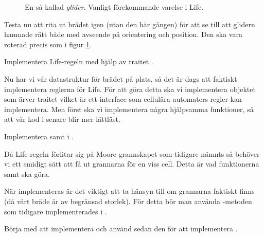 \begin{figure}[h]
  \begin{center}
  \end{center}
  \caption{En så kallad \textit{glider}. Vanligt förekommande varelse i Life.}
  \label{fig:threads:life:glider}
\end{figure}

Testa nu att rita ut brädet igen (utan  den här gången) för att se till att glidern hamnade rätt både med avseende på orientering och position. Den ska vara roterad precis som i figur \ref{fig:threads:life:glider}.


\Task Implementera Life-regeln med hjälp av traitet .

Nu har vi vår datastruktur för brädet på plats, så det är dags att faktiskt implementera reglerna för Life. För att göra detta ska vi implementera objektet  som ärver traitet  vilket är ett interface som cellulära automaters regler kan implementera. Men först ska vi implementera några hjälpsamma funktioner, så att vår kod i  senare blir mer lättläst.

\Subtask Implementera  samt  i .

Då Life-regeln förlitar sig på Moore-grannskapet som tidigare nämnts så behöver vi ett smidigt sätt att få ut grannarna för en viss cell. Detta är vad funktionerna  samt  ska göra.

När  implementeras är det viktigt att ta hänsyn till om grannarna faktiskt finns (då vårt bräde är av begränsad storlek).
För detta bör man använda -metoden som tidigare implementerades i .

Börja med att implementera  och använd sedan den för att implementera .

